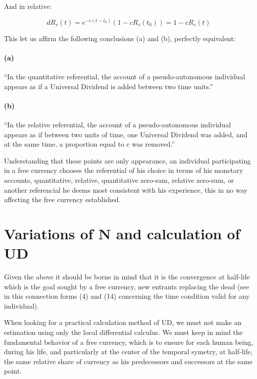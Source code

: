 \documentclass[a4paper,oneside,12pt]{article}
\begin{document}
And in relative:

\begin{displaymath}dR_s(t)=e^{-c(t-t_{0})} \left( 1-cR_s(t_{0}) \right) = 1-cR_s(t) \end{displaymath}

This let us affirm the following conclusions (a) and (b), perfectly equivalent:

\paragraph*{(a)}

``In the quantitative referential, the account of a pseudo-autonomous
individual appears as if a Universal Dividend is added between two
time units.''

\paragraph*{(b)}

``In the relative referential, the account of a pseudo-autonomous
individual appears as if between two units of time, one Universal
Dividend was added, and at the same time, a proportion equal to c was
removed.'' 


Understanding that these points are only appearance, an individual
participating in a free currency chooses the referential of his choice
in terms of his monetary accounts, quantitative, relative,
quantitative zero-sum, relative zero-sum, or another referencial he
deems most consistent with his experience, this in no way affecting
the free currency established.

\section{Variations of N and calculation of UD}

Given the above it should be borne in mind that it is the convergence
at half-life which is the goal sought by a free currency, new
entrants replacing the dead (see in this connection forms (4) and (14)
concerning the time condition valid for any individual). 

When looking for a practical calculation method of UD, we must not
make an estimation using only the local differential calculus.  We
must keep in mind the fundamental behavior of a free currency, which
is to ensure for each human being, during his life, and particularly
at the center of the temporal symetry, at half-life, the same relative
share of currency as his predecessors and successors at the same point.
\end{document}
